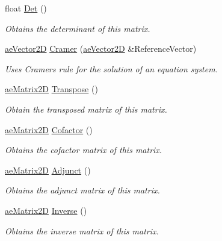 \begin{DoxyCompactItemize}
\item 
float \hyperlink{structae_core_1_1ae_matrix2_d_a59937c6ebec1f73a538c6304abfabc1b}{Det} ()
\begin{DoxyCompactList}\small\item\em Obtains the determinant of this matrix. \end{DoxyCompactList}\item 
\hyperlink{structae_core_1_1ae_vector2_d}{ae\+Vector2D} \hyperlink{structae_core_1_1ae_matrix2_d_a0c724122c4c482fe6ed84eec81ca17cf}{Cramer} (\hyperlink{structae_core_1_1ae_vector2_d}{ae\+Vector2D} \&Reference\+Vector)
\begin{DoxyCompactList}\small\item\em Uses Cramer\textquotesingle{}s rule for the solution of an equation system. \end{DoxyCompactList}\item 
\hyperlink{structae_core_1_1ae_matrix2_d}{ae\+Matrix2D} \hyperlink{structae_core_1_1ae_matrix2_d_a66c72ddd7d4a11d67a330030b8e79ac8}{Transpose} ()
\begin{DoxyCompactList}\small\item\em Obtain the transposed matrix of this matrix. \end{DoxyCompactList}\item 
\hyperlink{structae_core_1_1ae_matrix2_d}{ae\+Matrix2D} \hyperlink{structae_core_1_1ae_matrix2_d_a9c4c53d9fab677a6c0cb8462728c79bb}{Cofactor} ()
\begin{DoxyCompactList}\small\item\em Obtains the cofactor matrix of this matrix. \end{DoxyCompactList}\item 
\hyperlink{structae_core_1_1ae_matrix2_d}{ae\+Matrix2D} \hyperlink{structae_core_1_1ae_matrix2_d_ac078d0572410a49e49d480ade41b1209}{Adjunct} ()
\begin{DoxyCompactList}\small\item\em Obtains the adjunct matrix of this matrix. \end{DoxyCompactList}\item 
\hyperlink{structae_core_1_1ae_matrix2_d}{ae\+Matrix2D} \hyperlink{structae_core_1_1ae_matrix2_d_ad6ea633a89d7f1cfec91c991bb542072}{Inverse} ()
\begin{DoxyCompactList}\small\item\em Obtains the inverse matrix of this matrix. \end{DoxyCompactList}\end{DoxyCompactItemize}
